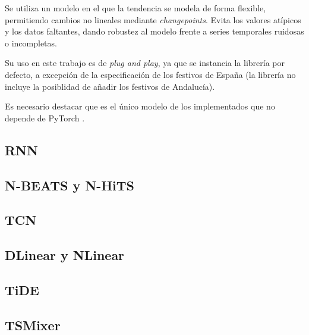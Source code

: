 Se utiliza un modelo en el que la tendencia se modela de forma flexible, permitiendo cambios no lineales mediante \textit{changepoints}. Evita los valores atípicos y los datos faltantes, dando robustez al modelo frente a series temporales ruidosas o incompletas.

Su uso en este trabajo es de \textit{plug and play}, ya que se instancia la librería por defecto, a excepción de la especificación de los festivos de España (la librería no incluye la posiblidad de añadir los festivos de Andalucía).

Es necesario destacar que es el único modelo de los implementados que no depende de PyTorch \cite{pytorch}.

\subsection{RNN}
\subsection{N-BEATS y N-HiTS}
\subsection{TCN}
\subsection{DLinear y NLinear}
\subsection{TiDE}
\subsection{TSMixer}
